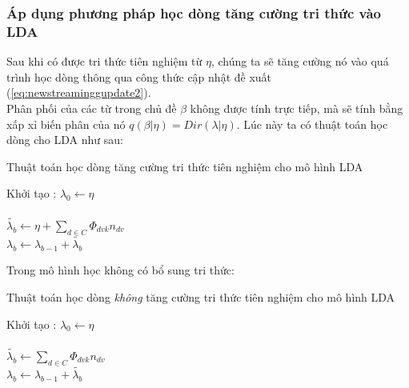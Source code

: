 \documentclass[fontsize=13pt]{scrartcl}
\begin{document}
\subsubsection{Áp dụng phương pháp học dòng tăng cường tri thức vào LDA}
\label{sec:PartIII}
Sau khi có được tri thức tiên nghiệm từ $\eta$, chúng ta sẽ tăng cường nó vào quá trình học dòng thông qua công thức cập nhật đề xuất (\ref{eq:newstreaminggupdate2}).\\
Phân phối của các từ trong chủ đề $\beta$ không được tính trực tiếp, mà sẽ tính bằng xấp xỉ biến phân của nó $q(\beta | \eta) = Dir(\lambda | \eta)$.
Lúc này ta có thuật toán học dòng cho LDA như sau: 





\begin{algorithm}[H]
\begin{algorithmic}
\caption{Thuật toán học dòng tăng cường tri thức tiên nghiệm cho mô hình LDA}
\label{streamupdateLDA}
Khởi tạo : $\lambda_0 \leftarrow \eta$\\
\ENDFOR\\
$\tilde{\lambda_b} \leftarrow \eta + \sum_{d \in C} \Phi_{dvk}n_{dv}$\\
$\lambda_{b} \leftarrow \lambda_{b-1}+\tilde{\lambda_{b}}$
\ENDFOR
\end{algorithmic}
\end{algorithm}
Trong mô hình học không có bổ sung tri thức:
\begin{algorithm}[H]
\begin{algorithmic}
\caption{Thuật toán học dòng \emph{không} tăng cường tri thức tiên nghiệm cho mô hình LDA}
\label{streamupdateLDAOld}
Khởi tạo : $\lambda_0 \leftarrow \eta$\\
\ENDFOR\\
$\tilde{\lambda_b} \leftarrow  \sum_{d \in C} \Phi_{dvk}n_{dv}$\\
$\lambda_{b} \leftarrow \lambda_{b-1}+\tilde{\lambda_{b}}$
\ENDFOR
\end{algorithmic}
\end{algorithm}
\end{document}
